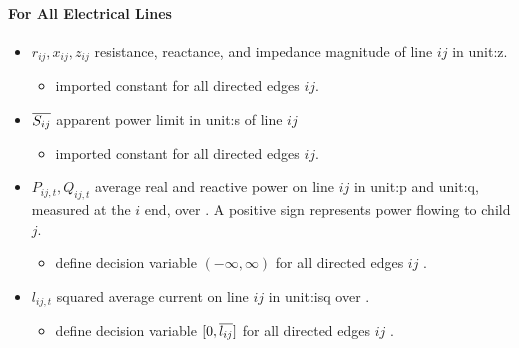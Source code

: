 \paragraph{For All Electrical Lines}
\begin{itemize}

\item $r_{ij}, x_{ij}, z_{ij}$ resistance, reactance, and impedance magnitude
  of line $ij$ in \gls{unit:z}.  \begin{itemize} \item \gls{imported} constant
  for all directed edges $ij$.  \end{itemize}

\item $\overline{S_{ij}}$ apparent power limit in \gls{unit:s} of line $ij$
  \begin{itemize} \item \gls{imported} constant for all directed edges
  $ij$.  \end{itemize}

\item $P_{ij,t}, Q_{ij,t}$ average real and reactive power on line $ij$ in
\gls{unit:p} and \gls{unit:q}, measured at the $i$ end, over \intervaloft{}.
A positive sign represents power flowing to child
  $j$.  \begin{itemize} \item \gls{define} decision variable $(-\infty, \infty)$
  for all directed edges $ij$ \atallt{}.  \end{itemize}

\item $l_{ij,t}$ squared average current on line $ij$ in \gls{unit:isq} over
\intervaloft{}.
  \begin{itemize} \item \gls{define} decision variable $[0, \overline{l_{ij}}]$ for
  all directed edges $ij$ \atallt{}.  \end{itemize}

\end{itemize}
